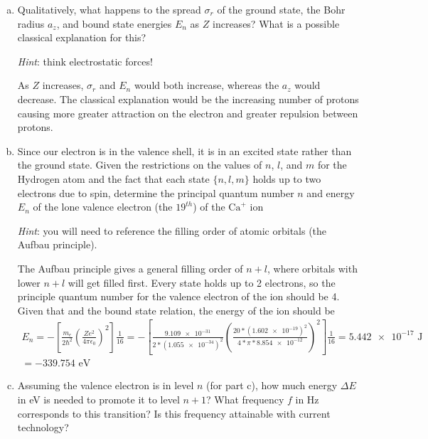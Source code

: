\documentclass[10pt,letterpaper]{article}
\begin{document}
\begin{enumerate}
\begin{enumerate}[a)]
\begin{enumerate}[i)]
\end{enumerate}

\item Qualitatively, what happens to the spread $\sigma_{r}$ of the ground state, the Bohr radius $a_{z}$, and bound state energies $E_{n}$ as $Z$ increases? What is a possible classical explanation for this?

\textit{Hint}: think electrostatic forces!

\color{violet}
As $Z$ increases, $\sigma_{r}$ and $E_{n}$ would both increase, whereas the $a_{z}$ would decrease. The classical explanation would be the increasing number of protons causing more greater attraction on the electron and greater repulsion between protons. 
\color{black}


\item Since our electron is in the valence shell, it is in an excited state rather than the ground state. Given the restrictions on the values of $n$, $l$, and $m$ for the Hydrogen atom and the fact that each state $\{ n, l, m \}$ holds up to two electrons due to spin, determine the principal quantum number $n$ and energy $E_{n}$ of the lone valence electron (the $19^{th}$) of the $\text{Ca}^{+}$ ion

\textit{Hint}: you will need to reference the filling order of atomic orbitals (the Aufbau principle).

\color{violet}
The Aufbau principle gives a general filling order of $n + l$, where orbitals with lower $n + l$ will get filled first. Every state holds up to 2 electrons, so the principle quantum number for the valence electron of the ion should be 4. Given that and the bound state relation, the energy of the ion should be
\begin{gather*}
E_{n} = - \left[ \frac{m_{e}}{2\hbar^{2}} \left( \frac{Ze^{2}}{4\pi\epsilon_{0}} \right)^{2} \right] \frac{1}{16} = -\left[ \frac{\num{9.109e-31}}{2 * (\num{1.055e-34})^2} \left( \frac{20 * (\num{1.602e-19})^2}{4 * \pi * \num{8.854e-12}} \right)^2 \right] \frac{1}{16} = \num{5.442e-17}\text{ J} \\
= -339.754\text{ eV}
\end{gather*}
\color{black}

\item Assuming the valence electron is in level $n$ (for part c), how much energy $\Delta E$ in eV is needed to promote it to level $n + 1$? What frequency $f$ in Hz corresponds to this transition? Is this frequency attainable with current technology?


\end{enumerate}
\end{enumerate}
\end{document}
